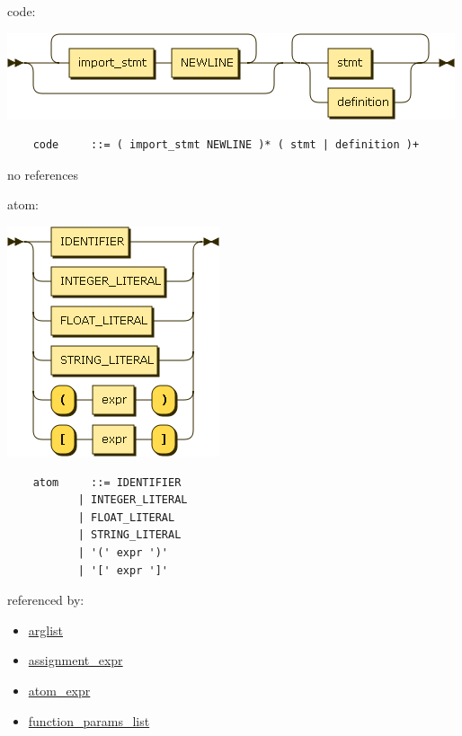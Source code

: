 \begin{minipage}{\textwidth}
    \protect\hypertarget{code}{}{code:}

    \includegraphics[width=5.18750in,height=1.00000in]{diagram/code.png}

    \begin{verbatim}
    code     ::= ( import_stmt NEWLINE )* ( stmt | definition )+
    \end{verbatim}

    no references

\end{minipage}

\begin{minipage}{\textwidth}
    \protect\hypertarget{atom}{}{atom:}

    \includegraphics[width=2.45833in,height=2.66667in]{diagram/atom.png}

    \begin{verbatim}
    atom     ::= IDENTIFIER
           | INTEGER_LITERAL
           | FLOAT_LITERAL
           | STRING_LITERAL
           | '(' expr ')'
           | '[' expr ']'
    \end{verbatim}

    referenced by:

    \begin{itemize}
            \tightlist
        \item
            \protect\hyperlink{arglist}{arglist}
        \item
            \protect\hyperlink{assignment_expr}{assignment\_expr}
        \item
            \protect\hyperlink{atom_expr}{atom\_expr}
        \item
            \protect\hyperlink{function_params_list}{function\_params\_list}
    \end{itemize}

\end{minipage}

